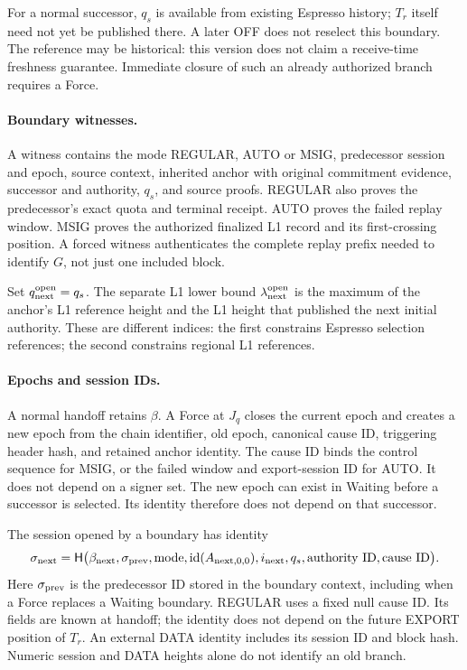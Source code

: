 \documentclass[11pt,a4paper]{article}
\newcommand{\Hash}{\mathsf H}
\begin{document}
For a normal successor, $q_s$ is available from existing Espresso
history; $T_r$ itself need not yet be published there. A later OFF does
not reselect this boundary. The reference may be historical: this
version does not claim a receive-time freshness guarantee. Immediate
closure of such an already authorized branch requires a Force.

\paragraph{Boundary witnesses.}
A witness contains the mode REGULAR, AUTO or MSIG, predecessor session
and epoch, source context, inherited anchor with original commitment evidence,
successor and authority, $q_s$, and source proofs. REGULAR also proves
the predecessor's exact quota and terminal receipt. AUTO proves the
failed replay window. MSIG proves the authorized finalized L1 record
and its first-crossing position. A forced witness authenticates the
complete replay prefix needed to identify $G$, not just one included
block.

Set $q^{\rm open}_{\rm next}=q_s$. The separate L1 lower bound
$\lambda^{\rm open}_{\rm next}$ is the maximum of the anchor's L1
reference height and the L1 height that published the next initial
authority. These are different indices: the first constrains Espresso
selection references; the second constrains regional L1 references.

\paragraph{Epochs and session IDs.}
A normal handoff retains $\beta$. A Force at $J_q$ closes the current
epoch and creates a new epoch from the chain identifier, old epoch,
canonical cause ID, triggering header hash, and retained anchor identity.
The cause ID binds the control sequence for MSIG, or the failed window
and export-session ID for AUTO. It does not depend on a signer set.
The new epoch can exist in Waiting before a successor is selected.
Its identity therefore does not depend on that successor.

The session opened by a boundary has identity
\[
 \sigma_{\rm next}=\Hash\bigl(\beta_{\rm next},\sigma_{\rm prev},
   \text{mode},\operatorname{id}(A_{\rm next,0,0}),
   i_{\rm next},q_s,\text{authority ID},\text{cause ID}\bigr).
\]
Here $\sigma_{\rm prev}$ is the predecessor ID stored in the boundary
context, including when a Force replaces a Waiting boundary.
REGULAR uses a fixed null cause ID. Its fields are known at handoff;
the identity does not depend on the future EXPORT position of $T_r$.
An external DATA identity includes its session ID and block hash.
Numeric session and DATA heights alone do not identify an old branch.
\end{document}
